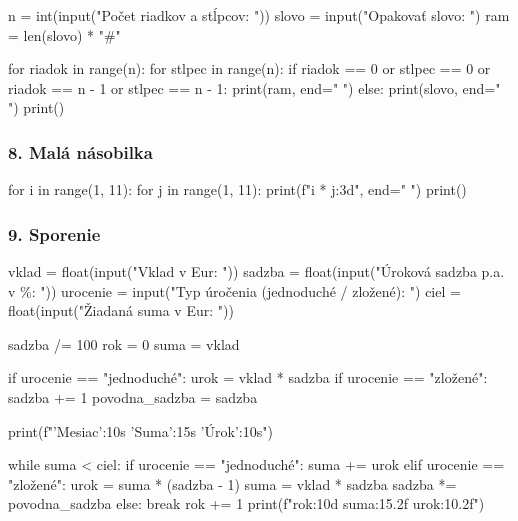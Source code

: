 \begin{solution}
n = int(input("Počet riadkov a stĺpcov: "))
slovo = input("Opakovať slovo: ")
ram = len(slovo) * "#"

for riadok in range(n):
    for stlpec in range(n):
        if riadok == 0 or stlpec == 0 or riadok == n - 1 or stlpec == n - 1:
            print(ram, end=" ")
        else:
            print(slovo, end=" ")
    print()
\end{solution}


\subsubsection*{8. Malá násobilka}

\begin{solution}
for i in range(1, 11):
    for j in range(1, 11):
        print(f"{i * j:3d}", end=" ")
    print()
\end{solution}


\subsubsection*{9. Sporenie}

\begin{solution}
vklad = float(input("Vklad v Eur: "))
sadzba = float(input("Úroková sadzba p.a. v \%: "))
urocenie = input("Typ úročenia (jednoduché / zložené): ")
ciel = float(input("Žiadaná suma v Eur: "))

sadzba /= 100
rok = 0
suma = vklad

if urocenie == "jednoduché":
    urok = vklad * sadzba
if urocenie == "zložené":
    sadzba += 1
    povodna_sadzba = sadzba

print(f"{'Mesiac':10s} {'Suma':15s} {'Úrok':10s}")

while suma < ciel:
    if urocenie == "jednoduché":
        suma += urok
    elif urocenie == "zložené":
        urok = suma * (sadzba - 1)
        suma = vklad * sadzba
        sadzba *= povodna_sadzba
    else:
        break
    rok += 1
    print(f"{rok:10d} {suma:15.2f} {urok:10.2f}")
\end{solution}
